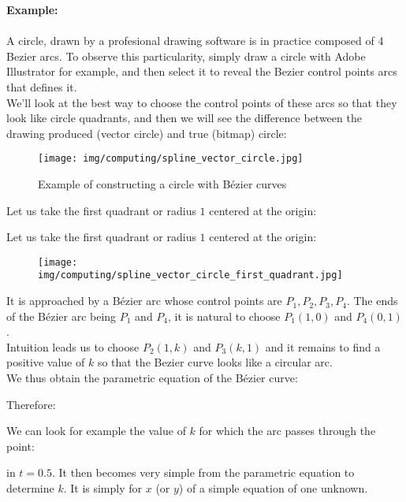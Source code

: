 	\begin{tcolorbox}[colframe=black,colback=white,sharp corners]
	\textbf{{\Large {}}Example:}\\\\
	A circle, drawn by a profesional drawing software is in practice composed of 4 Bezier arcs. To observe this particularity, simply draw a circle with Adobe Illustrator for example, and then select it to reveal the Bezier control points arcs that defines it.\\
	
	We'll look at the best way to choose the control points of these arcs so that they look like circle quadrants, and then we will see the difference between the drawing produced (vector circle) and true (bitmap) circle:
	\begin{figure}[H]
		\centering
		\texttt{[image: img/computing/spline\_vector\_circle.jpg]}
		\caption{Example of constructing a circle with Bézier curves}
	\end{figure}
	Let us take the first quadrant or radius $1$ centered at the origin:
	
	\end{tcolorbox}
	
	\pagebreak
	\begin{tcolorbox}[colframe=black,colback=white,sharp corners]
	Let us take the first quadrant or radius $1$ centered at the origin:
	\begin{figure}[H]
		\centering
		\texttt{[image: img/computing/spline\_vector\_circle\_first\_quadrant.jpg]}
	\end{figure}
	It is approached by a Bézier arc whose control points are $P_1,P_2,P_3,P_4$. The ends of the Bézier arc being $P_1$ and $P_4$, it is natural to choose $P_1(1,0)$ and $P_4(0,1)$.\\
	
	Intuition leads us to choose $P_2(1,k)$ and $P_3(k,1)$ and it remains to find a positive value of $k$ so that the Bezier curve looks like a circular arc.\\
	
	We thus obtain the parametric equation of the Bézier curve:
	
	Therefore:
	
	We can look for example the value of $k$ for which the arc passes through the point:
	
	in $t=0.5$. It then becomes very simple from the parametric equation to determine $k$. It is simply for $x$ (or $y$) of a simple equation of one unknown.
	\end{tcolorbox}
	

